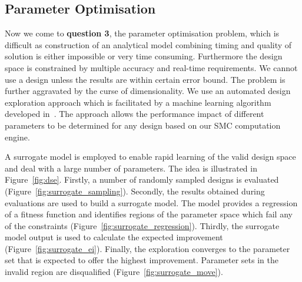 \subsection{Parameter Optimisation}
\label{sec:dse}

Now we come to \textbf{question 3}, the parameter optimisation problem, which is difficult as construction of an analytical model combining timing and quality of solution is either impossible or very time consuming. 
Furthermore the design space is constrained by multiple accuracy and real-time requirements.
We cannot use a design unless the results are within certain error bound.
The problem is further aggravated by the curse of dimensionality.
We use an automated design exploration approach which is facilitated by a machine learning algorithm developed in~\cite{kurek13b}.
The approach allows the performance impact of different parameters to be determined for any design based on our SMC computation engine. 

A surrogate model is employed to enable rapid learning of the valid design space and deal with a large number of parameters.
The idea is illustrated in Figure~\ref{fig:dse}.
Firstly, a number of randomly sampled designs is evaluated (Figure~\ref{fig:surrogate_sampling}).
Secondly, the results obtained during evaluations are used to build a surrogate model.
The model provides a regression of a fitness function and identifies regions of the parameter space which fail any of the constraints (Figure~\ref{fig:surrogate_regression}).
Thirdly, the surrogate model output is used to calculate the expected improvement (Figure~\ref{fig:surrogate_ei}).
Finally, the exploration converges to the parameter set that is expected to offer the highest improvement.
Parameter sets in the invalid region are disqualified (Figure~\ref{fig:surrogate_move}).

